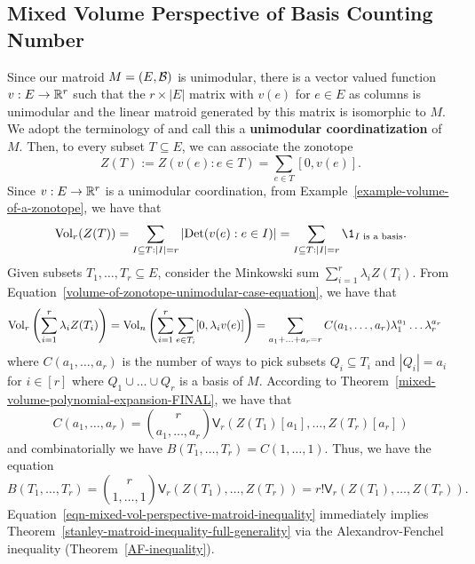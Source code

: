 \documentclass{puthesis-UG}
\begin{document}
\subsection{Mixed Volume Perspective of Basis Counting Number} \label{section-mixed-volume-persepctive-of-basis-counting-number}

Since our matroid $M = (E, \mathcal{B})$ is unimodular, there is a vector valued function $v : E \to \mathbb{R}^r$ such that the $r \times |E|$ matrix with $v(e)$ for $e \in E$ as columns is unimodular and the linear matroid generated by this matrix is isomorphic to $M$. We adopt the terminology of \cite{STANLEY} and call this a \textbf{unimodular coordinatization} of $M$. Then, to every subset $T \subseteq E$, we can associate the zonotope
\[
	Z(T) := Z(v(e) : e \in T) = \sum_{e \in T}[0, v(e)].
\]
Since $v : E \to \mathbb{R}^r$ is a unimodular coordination, from Example~\ref{example-volume-of-a-zonotope}, we have that 
\begin{equation} \label{volume-of-zonotope-unimodular-case-equation}
	\Vol_r(Z(T)) = \sum_{I \subseteq T : |I| = r} |\text{Det}(v(e) : e \in I)| = \sum_{I \subseteq T : |I| = r} \1_{I \text{ is a basis}}. 
\end{equation}
Given subsets $T_1, \ldots, T_r \subseteq E$, consider the Minkowski sum $\sum_{i = 1}^r \lambda_i Z(T_i)$. From Equation~\ref{volume-of-zonotope-unimodular-case-equation}, we have that 
\begin{align*}
	\operatorname{Vol}_r \left ( \sum_{i = 1}^r \lambda_i Z(T_i) \right ) & = \operatorname{Vol}_n \left (\sum_{i = 1}^r \sum_{e \in T_i} [0, \lambda_i v(e)] \right ) = \sum_{a_1 + \ldots + a_r = r} C(a_1, \ldots, a_r) \lambda_1^{a_1} \ldots \lambda_r^{a_r}
\end{align*}
where $C(a_1, \ldots, a_r)$ is the number of ways to pick subsets $Q_i \subseteq T_i$ and $|Q_i| = a_i$ for $i \in [r]$ where $Q_1 \cup \ldots \cup Q_r$ is a basis of $M$. According to Theorem~\ref{mixed-volume-polynomial-expansion-FINAL}, we have that 
\[
	C(a_1, \ldots, a_r) = \binom{r}{a_1, \ldots, a_r} \mathsf{V}_r (Z(T_1)[a_1], \ldots, Z(T_r)[a_r])
\]
and combinatorially we have $B(T_1, \ldots, T_r) = C(1, \ldots, 1)$. Thus, we have the equation
\begin{equation} \label{eqn-mixed-vol-perspective-matroid-inequality}
	B(T_1, \ldots, T_r) = \binom{r}{1, \ldots, 1} \mathsf{V}_r(Z(T_1), \ldots, Z(T_r)) = r! \mathsf{V}_r(Z(T_1), \ldots, Z(T_r)). 
\end{equation}
Equation~\ref{eqn-mixed-vol-perspective-matroid-inequality} immediately implies Theorem~\ref{stanley-matroid-inequality-full-generality} via the Alexandrov-Fenchel inequality (Theorem~\ref{AF-inequality}).
\end{document}
